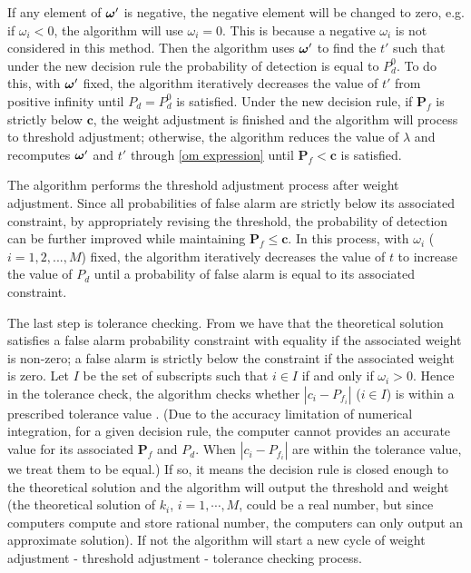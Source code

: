 If any element of $\boldsymbol{\omega}'$ is negative, the negative element will be changed to zero, e.g. if $\omega_i < 0$, the algorithm will use $\omega_i = 0$. This is because a negative  $\omega_i$ is not considered in this method.  
Then the algorithm uses $\boldsymbol{\omega}'$ to find the $t'$ such that under the new decision rule the probability of detection is equal to  $P_d^0$. To do this, with $\boldsymbol{\omega}'$ fixed, the algorithm iteratively decreases the value of $t'$ from positive infinity until $P_d = P_d^0$ is satisfied. Under the new decision rule, if $\mathbf{P}_f$ is strictly below $\mathbf{c}$, the weight adjustment is finished and the algorithm will process to  threshold adjustment; otherwise, the algorithm reduces the value of $\lambda$ and recomputes $\boldsymbol{\omega}'$ and $t'$ through \eqref{om expression} until $\mathbf{P}_f < \mathbf{c}$  is satisfied. 

 The algorithm performs the threshold adjustment process after weight adjustment. Since all probabilities of false alarm are strictly below its associated constraint, by appropriately revising the threshold, the probability of detection can be further improved while maintaining $\mathbf{P}_f \leq \mathbf{c}$. In this process, with $\omega_i$ ($i=1, 2, ..., M$) fixed, the algorithm iteratively decreases the value of $t$ to increase the value of $P_d$ until a probability of false alarm is equal to its associated constraint.  

The last step is tolerance checking. From \cite{zhang2000efficient} we have that the theoretical solution satisfies a false alarm probability constraint with equality if the associated weight is non-zero; a false alarm is strictly below the constraint if the associated weight is zero. 
Let $I$ be the set of subscripts such that $i \in I$ if and only if $\omega_i > 0$. 
Hence in the tolerance check, the algorithm checks whether $|c_i - P_{f_i}|$ ($i \in I$) is within a prescribed tolerance value . 
(Due to the accuracy limitation of numerical integration, for a given decision rule, the computer cannot provides an accurate value for its associated $\mathbf{P}_f$ and $P_d$. When $|c_i - P_{f_i}|$ are within the tolerance value, we treat them to be equal.) 
If so, it means the decision rule is closed enough to the theoretical solution  and the algorithm will output the threshold and weight (the theoretical solution of $k_i$, $i= 1, \cdots, M$, could be a real number, but since computers compute and store rational number, the computers can only output an approximate solution). If not the algorithm will start a new cycle of weight adjustment - threshold adjustment - tolerance checking process. 

